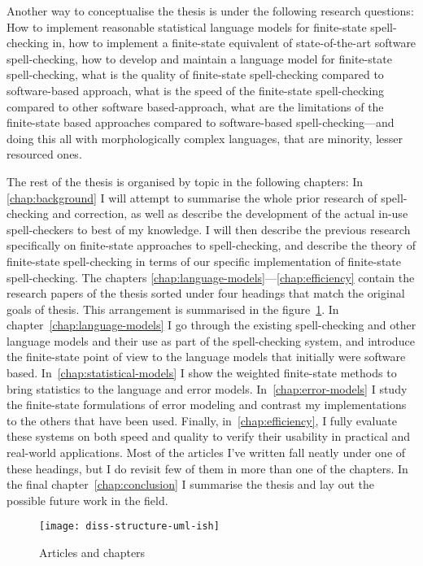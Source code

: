 \documentclass[officiallayout]{unihelcompling}
\begin{document}
Another way to conceptualise the thesis is under the following research
questions: How to implement reasonable statistical language models for
finite-state spell-checking in, how to implement a finite-state equivalent of
state-of-the-art software spell-checking, how to develop and maintain a
language model for finite-state spell-checking, what is the quality of
finite-state spell-checking compared to software-based approach, what is the
speed of the finite-state spell-checking compared to other software
based-approach, what are the limitations of the finite-state based approaches
compared to software-based spell-checking---and doing this all with
morphologically complex languages, that are minority, lesser resourced ones.

The rest of the thesis is organised by topic in the following chapters: In
\ref{chap:background} I will attempt to summarise the whole prior research of
spell-checking and correction, as well as describe the development of the
actual in-use spell-checkers to best of my knowledge. I will then describe the
previous research specifically on finite-state approaches to spell-checking,
and describe the theory of finite-state spell-checking in terms of our specific
implementation of finite-state spell-checking. The chapters
\ref{chap:language-models}---\ref{chap:efficiency} contain the research papers
of the thesis sorted under four headings that match the original goals of
thesis. This arrangement is summarised in the
figure~\ref{fig:articles-chapters}. In chapter~\ref{chap:language-models} I go
through the existing spell-checking and other language models and their use as
part of the spell-checking system, and introduce the finite-state point of view
to the language models that initially were software based.
In~\ref{chap:statistical-models} I show the weighted finite-state methods to
bring statistics to the language and error models. In~\ref{chap:error-models}
I study the finite-state formulations of error modeling and contrast my
implementations to the others that have been used. Finally, 
in~\ref{chap:efficiency}, I fully evaluate these systems on both speed and
quality to verify their usability in practical and real-world applications.
Most of the articles I've written fall neatly under one of these headings, but I do revisit few of them in more than one of the chapters. In the final 
chapter~\ref{chap:conclusion} I summarise the thesis and lay out the possible
future work in the field.

\begin{figure}
    \texttt{[image: diss-structure-uml-ish]}
    \caption{Articles and chapters
    \label{fig:articles-chapters}}
\end{figure}
\end{document}
